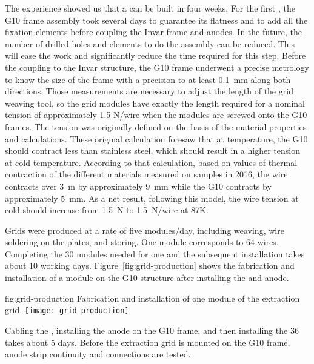 The  experience showed us that a   can be built in four weeks. For the first , the G10 frame assembly 
took several days to guarantee its flatness and
 to add all the fixation elements before coupling the Invar frame and anodes. In the future, the number of drilled holes and elements to do the assembly can be reduced. This will ease the work and significantly reduce the time required for this step.
Before the coupling to the Invar structure, the G10 frame underwent a precise metrology to know the size of the frame with a precision  to at least \SI{0.1}{mm}  along both directions. Those measurements are necessary  to adjust the length of the grid weaving tool, so the grid modules have exactly the length required for a 
nominal tension of approximately \num{1.5} N/wire when the modules are screwed onto the G10 frames.
The tension was originally defined on the basis of the material 
properties and calculations. These original 
calculation foresaw that at  temperature, the G10 should contract less than stainless steel,
which should result in a higher tension at cold temperature. According to that calculation,
 based on values of thermal contraction of the different materials measured on samples in 2016, 
the wire contracts over \SI{3}{m} by approximately \SI{9}{mm} while the G10 contracts by approximately \SI{5}{mm}. As a net result, following this model, 
the wire tension at cold should increase from \SI{1.5}{N} to \SI{1.5}{N/wire} at 87K.

 Grids were produced at a rate of five modules/day, including weaving, wire soldering on the  plates, and storing. One module corresponds to \num{64} wires. Completing the \num{30} modules needed for one  and the subsequent
 installation takes about \num{10} working days. Figure~\ref{fig:grid-production} shows the fabrication and installation of
 a module on the G10 structure after installing the  and anode. 
\begin{dunefigure}
{fig:grid-production}
{Fabrication and installation of one module of the extraction grid.}
\texttt{[image: grid-production]}
\end{dunefigure}

Cabling the  , installing the anode on the G10 frame, and then installing the \num{36}  
takes about 5 days. Before the extraction grid is mounted on the G10 frame, anode strip continuity and  
 connections are tested.

